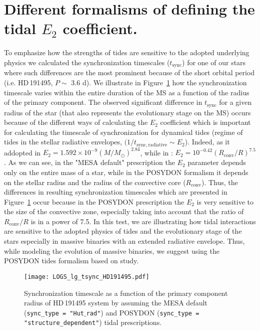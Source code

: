 \documentclass{aa}
\DeclareRobustCommand{\Figref}[1]{Figure~\ref{#1}}
\begin{document}
\section{Different formalisms of defining the tidal $E_{2}$ coefficient.}
\label{sec:e2_def}
To emphasize how the strengths of tides are sensitive to the adopted underlying physics we calculated the synchronization timescales ($t_\mathrm{sync}$) for one of our stars where such differences are the most prominent because of the short orbital period (i.e. HD\,191495, $P \sim$ 3.6 d).
We illustrate in \Figref{fig:lg_tsync} how the synchronization timescale varies within the entire duration of the MS as a function of the radius of the primary component.
The observed significant difference in $t_\mathrm{sync}$ for a given radius of the star (that also represents the evolutionary stage on the MS) occurs because of the different ways of calculating the $E_{2}$ coefficient which is important for calculating the timescale of synchronization for dynamical tides (regime of tides in the stellar radiative envelopes, $(1/t_\mathrm{sync, radiative} \sim E_{2}$).
Indeed, as it addopted in \citet[]["MESA default" prescriprions]{Hurley_2002} $E_\mathrm{2} = 1.592 \times 10^{-9} (M/M_\mathrm{\odot})^{2.84}$, while in \citet[]["POSYDON" formalims for H-rich stars]{Qin_2018}: $E_\mathrm{2} = 10^{-0.42} (R_\mathrm{conv}/R)^{7.5}$.
As we can see, in the "MESA default" prescription the $E_\mathrm{2}$ parameter depends only on the entire mass of a star, while in the POSYDON formalism it depends on the stellar radius and the radius of the convective core ($R_\mathrm{conv}$).
Thus, the differences in resulting synchronization timescales which are presented in \Figref{fig:lg_tsync} occur because in the POSYDON prescription the $E_\mathrm{2}$ is very sensitive to the size of the convective zone, especially taking into account that the ratio of $R_\mathrm{conv}/R$ is in a power of 7.5.
In this test, we are illustrating how tidal interactions are sensitive to the adopted physics of tides and the evolutionary stage of the stars especially in massive binaries with an extended radiative envelope.
Thus, while modeling the evolution of massive binaries, we suggest using the POSYDON tides formalism based on \citet{Qin_2018} study.

\begin{figure}[!ht]
  \centering
  \texttt{[image: LOGS\_lg\_tsync\_HD191495.pdf]}
  \caption{Synchronization timescale as a function of the primary component radius of HD\,191495 system by assuming the MESA default (\texttt{sync\_type = "Hut$\_$rad"}) and POSYDON (\texttt{sync\_type = "structure\_dependent"}) tidal prescriptions.}
  \label{fig:lg_tsync}
\end{figure}
\end{document}

